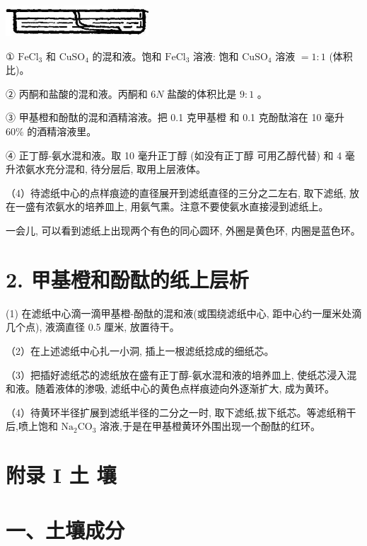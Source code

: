 \documentclass[10pt]{article}
\begin{document}
\begin{center}
\includegraphics[max width=0.4\textwidth]{images/01912d16-be99-77bb-9535-4f3ed8d9946f_228_303856.jpg}
\end{center}

① \({\mathrm{{FeCl}}}_{3}\) 和 \({\mathrm{{CuSO}}}_{4}\) 的混和液。饱和 \({\mathrm{{FeCl}}}_{3}\) 溶液: 饱和 \({\mathrm{{CuSO}}}_{4}\) 溶液 \(= 1 : 1\) (体积比)。

② 丙酮和盐酸的混和液。丙酮和 \({6N}\) 盐酸的体积比是 \(9 : 1\) 。

③ 甲基橙和酚酞的混和酒精溶液。把 0.1 克甲基橙 和 0.1 克酚酞溶在 10 毫升 \({60}\%\) 的酒精溶液里。

④ 正丁醇-氨水混和液。取 10 毫升正丁醇 (如没有正丁醇 可用乙醇代替) 和 4 毫升浓氨水充分混和, 待分层后, 取用上层液体。

（4）待滤纸中心的点样痕迹的直径展开到滤纸直径的三分之二左右, 取下滤纸, 放在一盛有浓氨水的培养皿上, 用氨气熏。注意不要使氨水直接浸到滤纸上。

一会儿, 可以看到滤纸上出现两个有色的同心圆环, 外圈是黄色环, 内圈是蓝色环。

\section*{2. 甲基橙和酚酞的纸上层析}

(1) 在滤纸中心滴一滴甲基橙-酚酞的混和液(或围绕滤纸中心, 距中心约一厘米处滴几个点), 液滴直径 0.5 厘米, 放置待干。

（2）在上述滤纸中心扎一小洞, 插上一根滤纸捻成的细纸芯。

（3）把插好滤纸芯的滤纸放在盛有正丁醇-氨水混和液的培养皿上, 使纸芯浸入混和液。随着液体的渗吸, 滤纸中心的黄色点样痕迹向外逐渐扩大, 成为黄环。

（4）待黄环半径扩展到滤纸半径的二分之一时, 取下滤纸,拔下纸芯。等滤纸稍干后,喷上饱和 \({\mathrm{{Na}}}_{2}{\mathrm{{CO}}}_{3}\) 溶液,于是在甲基橙黄环外围出现一个酚酞的红环。

\section*{附录 I 土 壤}

\section*{一、土壤成分}
\end{document}
